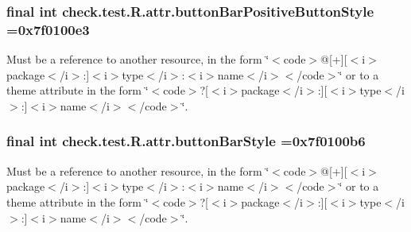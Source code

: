 \subsubsection[{button\+Bar\+Positive\+Button\+Style}]{\setlength{\rightskip}{0pt plus 5cm}final int check.\+test.\+R.\+attr.\+button\+Bar\+Positive\+Button\+Style =0x7f0100e3\hspace{0.3cm}{\ttfamily [static]}}\label{classcheck_1_1test_1_1_r_1_1attr_a9c25c7766ad861d2e9abc49971df83c5}
Must be a reference to another resource, in the form \char`\"{}$<$code$>$@\mbox{[}+\mbox{]}\mbox{[}$<$i$>$package$<$/i$>$\+:\mbox{]}$<$i$>$type$<$/i$>$\+:$<$i$>$name$<$/i$>$$<$/code$>$\char`\"{} or to a theme attribute in the form \char`\"{}$<$code$>$?\mbox{[}$<$i$>$package$<$/i$>$\+:\mbox{]}\mbox{[}$<$i$>$type$<$/i$>$\+:\mbox{]}$<$i$>$name$<$/i$>$$<$/code$>$\char`\"{}. \hypertarget{classcheck_1_1test_1_1_r_1_1attr_a42d587c40efc746d3bdd3ce6c788d5a8}{}
\subsubsection[{button\+Bar\+Style}]{\setlength{\rightskip}{0pt plus 5cm}final int check.\+test.\+R.\+attr.\+button\+Bar\+Style =0x7f0100b6\hspace{0.3cm}{\ttfamily [static]}}\label{classcheck_1_1test_1_1_r_1_1attr_a42d587c40efc746d3bdd3ce6c788d5a8}
Must be a reference to another resource, in the form \char`\"{}$<$code$>$@\mbox{[}+\mbox{]}\mbox{[}$<$i$>$package$<$/i$>$\+:\mbox{]}$<$i$>$type$<$/i$>$\+:$<$i$>$name$<$/i$>$$<$/code$>$\char`\"{} or to a theme attribute in the form \char`\"{}$<$code$>$?\mbox{[}$<$i$>$package$<$/i$>$\+:\mbox{]}\mbox{[}$<$i$>$type$<$/i$>$\+:\mbox{]}$<$i$>$name$<$/i$>$$<$/code$>$\char`\"{}. \hypertarget{classcheck_1_1test_1_1_r_1_1attr_a32cad5c610a0ee38f68d1a530b5e5714}{}
